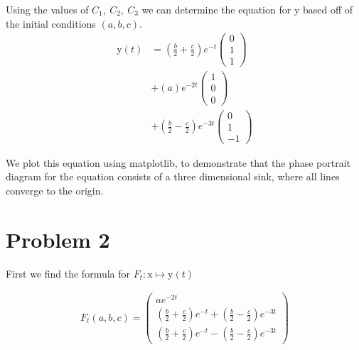 \documentclass[10pt]{article}
\newenvironment{Figure}
{\par\medskip\noindent\minipage{\linewidth}}
{\endminipage\par\medskip}
\begin{document}
\begin{multicols}{2}
  Using the values of $C_1,\ C_2,\ C_3$ we can determine the equation for
  $\mathrm{y}$ based off of the initial conditions $(a, b, c)$.
  \begin{align*}
    \mathrm{y}\left(t\right) &=
    \left(\frac{b}{2}+\frac{c}{2}\right)e^{-t}\begin{pmatrix}0\\1\\1\end{pmatrix}\\
    &+ \left(a\right)e^{-2t}\begin{pmatrix}1\\0\\0\end{pmatrix}\\
    &+\left(\frac{b}{2}-\frac{c}{2}\right)e^{-3t}\begin{pmatrix}0\\1\\-1\end{pmatrix}
  \end{align*}

  We plot this equation using matplotlib, to demonstrate that the phase portrait diagram for the
  equation consists of a three dimensional sink, where all lines converge to the origin.

  \begin{Figure}
    \centering
    \def\svgwidth{\columnwidth}
    
    \label{fig:p1_1}
  \end{Figure}

  \section{Problem 2}\label{sec:problem_2_}

  First we find the formula for $F_t:\mathrm{x}\mapsto \mathrm{y}\left(t\right)$

  \begin{align*}
    F_t\left(a,b,c\right) =\begin{pmatrix}ae^{-2t}\\
      \left(\frac{b}{2}+\frac{c}{2}\right)e^{-t} +
      \left(\frac{b}{2}-\frac{c}{2}\right)e^{-3t}\\
      \left(\frac{b}{2}+\frac{c}{2}\right)e^{-t}-\left(\frac{b}{2}-\frac{c}{2}\right)e^{-3t}
    \end{pmatrix}
  \end{align*}


\end{multicols}
\end{document}
